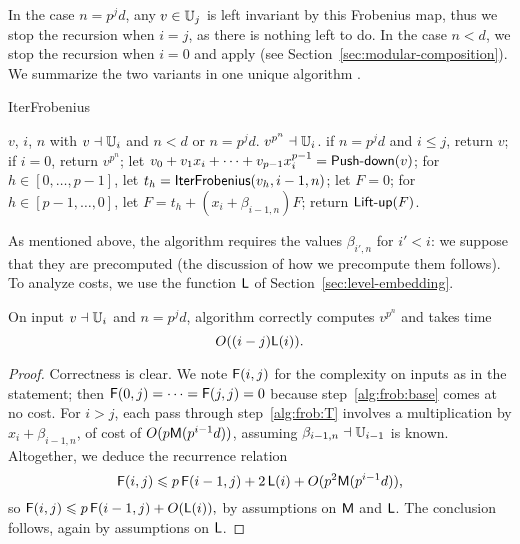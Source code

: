 In the case $n=p^jd$, any $v \in \mathbb{U}_j$ is left invariant by this
Frobenius map, thus we stop the recursion when $i=j$, as there is
nothing left to do. In the case $n<d$, we stop the recursion when
$i=0$ and apply (see Section~\ref{sec:modular-composition}). We
summarize the two variants in one unique algorithm
.

\begin{algorithm}
  \caption{IterFrobenius} 
  \begin{algorithmic}[1]
    \REQUIRE $v$, $i$, $n$ with $v\dashv\mathbb{U}_i$ and $n<d$ or $n=p^jd$.
    \ENSURE $v^{p^n} \dashv \mathbb{U}_i$.
    \STATE \label{alg:frob:base} if $n=p^jd$ and $i \le j$, return $v$;
    \STATE \label{alg:frob:base2} if $i=0$, return $v^{p^n}$;
    \STATE \label{alg:frob:push} let $v_0 + v_1 x_i + \dots + v_{p-1} x_i^{p-1}=\text{{\sf Push-down}}(v)$;
    \STATE \label{alg:frob:rec} for $h \in [0,\dots,p-1]$, let $t_h = {\sf IterFrobenius}(v_h, i-1, n)$;
    \STATE let $F=0$;
    \STATE\label{alg:frob:T} for $h \in [p-1,\dots,0]$, let $F = t_h +  (x_i+\beta_{i-1,n})F$;
    \STATE \label{alg:frob:lift} return $\text{{\sf Lift-up}}(F)$.
  \end{algorithmic}
\end{algorithm}

As mentioned above, the algorithm requires the values $\beta_{i',n}$
for $i'<i$: we suppose that they are precomputed (the discussion of
how we precompute them follows).  To analyze costs, we use the
function $\mathsf{L}$ of Section~\ref{sec:level-embedding}.
\begin{theorem}
  \label{th:b-ifrob}
  On input $v\dashv\mathbb{U}_i$ and $n=p^jd$, algorithm 
  correctly computes $v^{p^n}$ and takes time
  \begin{equation}
    \label{eq:95}
    O((i-j)\mathsf{L}(i))
    \text{.}
  \end{equation}
\end{theorem}
\begin{proof}
  Correctness is clear. We note $\mathsf{F}(i,j)$ for the complexity on
  inputs as in the statement; then $\mathsf{F}(0,j)=\cdots=\mathsf{F}(j,j)=0$
  because step~\ref{alg:frob:base} comes at no cost. For $i>j$, each
  pass through step~\ref{alg:frob:T} involves a multiplication by
  $x_i+\beta_{i-1,n}$, of cost of $O(p\mathsf{M}(p^{i-1}d))$, assuming
  $\beta_{i-1,n}\dashv \mathbb{U}_{i-1}$ is known. Altogether, we deduce the
  recurrence relation
  \begin{equation}
    \label{eq:75}
    \mathsf{F}(i,j) \leqslant
    p\,\mathsf{F}(i-1,j)+2\,\mathsf{L}(i)+O(p^2\mathsf{M}(p^{i-1}d))
    \text{,}
  \end{equation}
  so $\mathsf{F}(i,j) \leqslant p\,\mathsf{F}(i-1,j)+O(\mathsf{L}(i)),$ by assumptions on
  $\mathsf{M}$ and $\mathsf{L}$.  The conclusion follows, again by assumptions
  on $\mathsf{L}$.
\end{proof}

